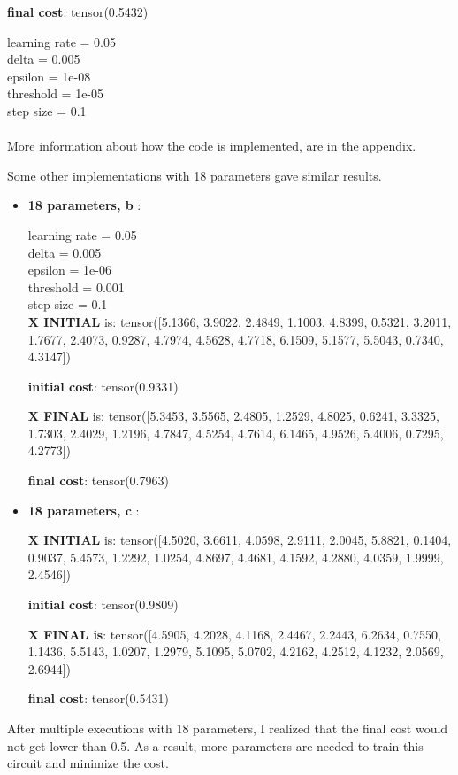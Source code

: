 \documentclass[inscr,ack,preface]{diphdthesis}
\begin{document}
\textbf{final cost}: tensor(0.5432)

learning rate =  0.05\\ 
delta =  0.005 \\
epsilon =  1e-08 \\
threshold =  1e-05 \\
step size =  0.1 \\
\\More information about how the code is implemented, are in the appendix.

Some other implementations with 18 parameters gave similar results.
\begin{itemize}
    \item \textbf{18 parameters, b } :
    
learning rate =  0.05 \\
delta =  0.005 \\
epsilon =  1e-06 \\
threshold =  0.001 \\
step size =  0.1 \\

\textbf{X INITIAL} is:
 tensor([5.1366, 3.9022, 2.4849, 1.1003, 4.8399, 0.5321, 3.2011, 1.7677, 2.4073,
        0.9287, 4.7974, 4.5628, 4.7718, 6.1509, 5.1577, 5.5043, 0.7340, 4.3147])

\textbf{initial cost}: tensor(0.9331)

\textbf{X FINAL} is:
 tensor([5.3453, 3.5565, 2.4805, 1.2529, 4.8025, 0.6241, 3.3325, 1.7303, 2.4029,
        1.2196, 4.7847, 4.5254, 4.7614, 6.1465, 4.9526, 5.4006, 0.7295, 4.2773])

\textbf{final cost}: tensor(0.7963)

\item \textbf{18 parameters, c }:

\textbf{X INITIAL} is:
 tensor([4.5020, 3.6611, 4.0598, 2.9111, 2.0045, 5.8821, 0.1404, 0.9037, 5.4573,
        1.2292, 1.0254, 4.8697, 4.4681, 4.1592, 4.2880, 4.0359, 1.9999, 2.4546])

\textbf{initial cost}: tensor(0.9809)

\textbf{X FINAL is}:
 tensor([4.5905, 4.2028, 4.1168, 2.4467, 2.2443, 6.2634, 0.7550, 1.1436, 5.5143,
        1.0207, 1.2979, 5.1095, 5.0702, 4.2162, 4.2512, 4.1232, 2.0569, 2.6944])

\textbf{final cost}: tensor(0.5431)

\end{itemize}

After multiple executions with 18 parameters, I realized that the final cost would not get lower than 0.5. As a result, more parameters are needed to train this circuit and minimize the cost. 
\end{document}
